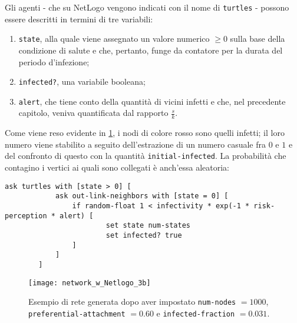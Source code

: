 Gli agenti - che su NetLogo vengono indicati con il nome di \texttt{turtles} - possono essere descritti in termini di tre variabili:
\begin{enumerate}
\item \texttt{state}, alla quale viene assegnato un valore numerico $ \geq 0 $ sulla base della condizione di salute e che, pertanto, funge da contatore per la durata del periodo d'infezione;
\item \texttt{infected?}, una variabile booleana;
\item \texttt{alert}, che tiene conto della quantità di vicini infetti e che, nel precedente capitolo, veniva quantificata dal rapporto $ \tfrac{s}{k}$.
\end{enumerate}
Come viene reso evidente in \cref{fig:NetLogo2}, i nodi di colore rosso sono quelli infetti; il loro numero viene stabilito a seguito dell'estrazione di un numero casuale fra $ 0 $ e $ 1 $ e del confronto di questo con la quantità \texttt{initial-infected}. La probabilità che contagino i vertici ai quali sono collegati è anch'essa aleatoria:
\begin{center}
	\begin{lstlisting}[autogobble,language={NetLogo},caption={Porzione di codice in cui si implementa il meccanismo di infezione.},label={list:infection_prob}]
		ask turtles with [state > 0] [
    		ask out-link-neighbors with [state = 0] [
      			if random-float 1 < infectivity * exp(-1 * risk-perception * alert) [
        				set state num-states
        				set infected? true
      			]
    		]
  		]  
	\end{lstlisting}
\end{center}
\begin{figure}[t]
		\begin{center}
			\texttt{[image: network\_w\_Netlogo\_3b]}
			\caption{Esempio di rete generata dopo aver impostato \texttt{num-nodes} $= 1000 $, \texttt{preferential-attachment} $= 0.60 $ e \texttt{infected-fraction} $= 0.031 $.}
			\label{fig:NetLogo2}
		\end{center}
\end{figure}
